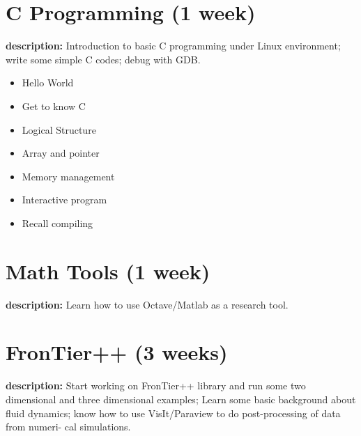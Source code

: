 \documentclass[12pt]{article}
\begin{document}
\newpage
\section*{C Programming (1 week)}
\textbf{description:}
Introduction to basic C programming under Linux environment; write
some simple C codes; debug with GDB.
\begin{multicols}{2}
\begin{itemize}
\item{Hello World}

\item{Get to know C}
	
\item{Logical Structure}
	
\item{Array and pointer}

\item{Memory management}
	
\item{Interactive program}

\item{Recall compiling}
\end{itemize}
\end{multicols}

\newpage
\section*{Math Tools (1 week)}
\textbf{description:}
Learn how to use Octave/Matlab as a research tool.

\newpage
\section*{FronTier++ (3 weeks)}
\textbf{description:}
Start working on FronTier++ library and run some two dimensional and three
dimensional examples; Learn some basic background about fluid dynamics;
know how to use VisIt/Paraview to do post-processing of data from numeri-
cal simulations.
\end{document}
